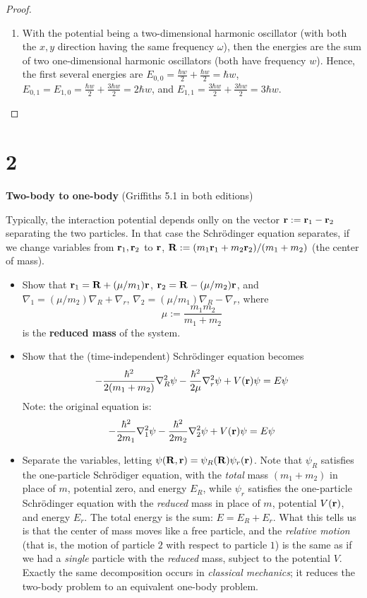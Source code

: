 \documentclass{article}
\begin{document}
\begin{proof}
\begin{enumerate}
        \item With the potential being a two-dimensional harmonic oscillator (with both the $x,y$ direction having the same frequency $\omega$), then the energies are the sum of two one-dimensional harmonic oscillators (both have frequency $w$). Hence, the first several energies are $E_{0,0}=\frac{\hbar w}{2}+\frac{\hbar w}{2}=\hbar w$, $E_{0,1}=E_{1,0}=\frac{\hbar w}{2}+\frac{3\hbar w}{2} = 2\hbar w$, and $E_{1,1}=\frac{3\hbar w}{2}+\frac{3\hbar w}{2}=3\hbar w$.
    \end{enumerate}
\end{proof}

\newpage

\section*{2}

\begin{ques}\label{q2}
\textbf{Two-body to one-body} (Griffiths 5.1 in both editions)

Typically, the interaction potential depends onlly on the vector $\mathbf{r}:= \mathbf{r}_1-\mathbf{r}_2$ separating the two particles. In that case the Schr\"odinger equation separates, if we change variables from $\mathbf{r}_1,\mathbf{r}_2$ to $\mathbf{r}$, $\mathbf{R}:=(m_1\mathbf{r}_1+m_2\mathbf{r}_2)/(m_1+m_2)$ (the center of mass).
\begin{itemize}
    \item[(a)] Show that $\mathbf{r}_1=\mathbf{R}+(\mu/m_1)\mathbf{r}$, $\mathbf{r}_2=\mathbf{R}-(\mu/m_2)\mathbf{r}$, and $\nabla_1 = (\mu/m_2)\nabla_R + \nabla_r$, $\nabla_2 = (\mu/m_1)\nabla_R - \nabla_r$, where 
    $$\mu:= \frac{m_1m_2}{m_1+m_2}$$
    is the \textbf{reduced mass} of the system.
    \item[(b)] Show that the (time-independent) Schr\"odinger equation becomes 
    $$-\frac{\hbar^2}{2(m_1+m_2)}\nabla_R^2\psi - \frac{\hbar^2}{2\mu}\nabla_r^2\psi + V(\mathbf{r})\psi = E\psi$$
    Note: the original equation is:
    $$-\frac{\hbar^2}{2m_1}\nabla_1^2\psi-\frac{\hbar^2}{2m_2}\nabla_2^2\psi + V(\mathbf{r})\psi = E\psi$$
    \item[(c)] Separate the variables, letting $\psi(\mathbf{R},\mathbf{r}) = \psi_R(\mathbf{R})\psi_r(\mathbf{r})$. Note that $\psi_R$ satisfies the one-particle Schr\"odiger equation, with the \emph{total} mass $(m_1+m_2)$ in place of $m$, potential zero, and energy $E_R$, while $\psi_r$ satisfies the one-particle Schr\"odinger equation with the \emph{reduced} mass in place of $m$, potential $V(\mathbf{r})$, and energy $E_r$. The total energy is the sum: $E=E_R+E_r$. What this tells us is that the center of mass moves like a free particle, and the \emph{relative motion} (that is, the motion of particle $2$ with respect to particle $1$) is the same as if we had a \emph{single} particle with the \emph{reduced} mass, subject to the potential $V$. Exactly the same decomposition occurs in \emph{classical mechanics}; it reduces the two-body problem to an equivalent one-body problem.
\end{itemize}
\end{ques}
\end{document}
